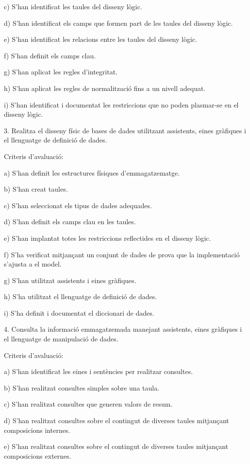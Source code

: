 \documentclass[catalan, a4paper, 12pt, titlepage]{article}
\begin{document}
c) S'han identificat les taules del disseny lògic.

d) S'han identificat els camps que formen part de les taules del disseny lògic.

e) S'han identificat les relacions entre les taules del disseny lògic.

f) S'han definit els camps clau.

g) S'han aplicat les regles d'integritat.

h) S'han aplicat les regles de normalització fins a un nivell adequat.

i) S'han identificat i documentat les restriccions que no poden plasmar-se en el disseny lògic.

3. Realitza el disseny físic de bases de dades utilitzant assistents, eines gràfiques i el llenguatge de definició de dades.

Criteris d'avaluació:

a) S'han definit les estructures físiques d'emmagatzematge.

b) S'han creat taules.

c) S'han seleccionat els tipus de dades adequades.

d) S'han definit els camps clau en les taules.

e) S'han implantat totes les restriccions reflectides en el disseny lògic.

f) S'ha verificat mitjançant un conjunt de dades de prova que la implementació s'ajusta a el model.

g) S'han utilitzat assistents i eines gràfiques.

h) S'ha utilitzat el llenguatge de definició de dades.

i) S'ha definit i documentat el diccionari de dades.

4. Consulta la informació emmagatzemada manejant assistents, eines gràfiques i el llenguatge de manipulació de dades.

Criteris d'avaluació:

a) S'han identificat les eines i sentències per realitzar consultes.

b) S'han realitzat consultes simples sobre una taula.

c) S'han realitzat consultes que generen valors de resum.

d) S'han realitzat consultes sobre el contingut de diverses taules mitjançant composicions internes.

e) S'han realitzat consultes sobre el contingut de diverses taules mitjançant composicions externes.
\end{document}
